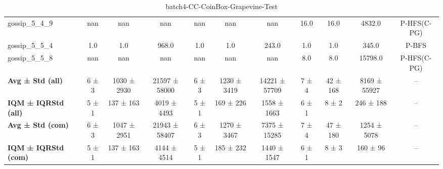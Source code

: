 \begin{table}[!ht]
\begin{tabular}{l|ccc|ccc|cccc}
gossip\_5\_4\_9 & nan & nan & nan & nan & nan & nan & 16.0 & 16.0 & 4832.0 & P-HFS(C-PG) \\
gossip\_5\_5\_4 & 1.0 & 1.0 & 968.0 & 1.0 & 1.0 & 243.0 & 1.0 & 1.0 & 345.0 & P-BFS \\
gossip\_5\_5\_8 & nan & nan & nan & nan & nan & nan & 8.0 & 8.0 & 15798.0 & P-HFS(C-PG) \\
\hline
\textbf{Avg ± Std (all)} & 6 ± 3 & 1030 ± 2930 & 21597 ± 58000 & 6 ± 3 & 1230 ± 3419 & 14221 ± 57709 & 7 ± 4 & 42 ± 168 & 8169 ± 55927 & -- \\
\textbf{IQM ± IQRStd (all)} & 5 ± 1 & 137 ± 163 & 4019 ± 4493 & 5 ± 1 & 169 ± 226 & 1558 ± 1663 & 6 ± 1 & 8 ± 2 & 246 ± 188 & -- \\
\textbf{Avg ± Std (com)} & 6 ± 3 & 1047 ± 2951 & 21943 ± 58407 & 6 ± 3 & 1270 ± 3467 & 7375 ± 15285 & 7 ± 4 & 47 ± 180 & 1254 ± 5078 & -- \\
\textbf{IQM ± IQRStd (com)} & 5 ± 1 & 137 ± 163 & 4144 ± 4514 & 5 ± 1 & 185 ± 232 & 1440 ± 1547 & 6 ± 1 & 8 ± 3 & 160 ± 96 & -- \\
\end{tabular}
\caption{batch4-CC-CoinBox-Grapevine-Test}
\label{tab:batch4_CC-CoinBox-Grapevine_comparison_test}
\end{table}
